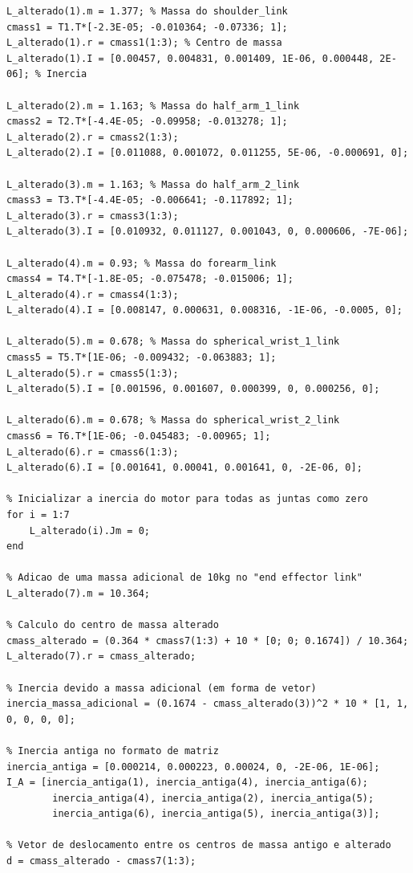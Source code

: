 \documentclass[10pt]{article}
\begin{document}
\begin{lstlisting}[caption={Código principal do trabalho}, label={code:codigo}]
% Massa, centro de massa e inercia para cada elo
L_alterado(1).m = 1.377; % Massa do shoulder_link
cmass1 = T1.T*[-2.3E-05; -0.010364; -0.07336; 1];
L_alterado(1).r = cmass1(1:3); % Centro de massa
L_alterado(1).I = [0.00457, 0.004831, 0.001409, 1E-06, 0.000448, 2E-06]; % Inercia

L_alterado(2).m = 1.163; % Massa do half_arm_1_link
cmass2 = T2.T*[-4.4E-05; -0.09958; -0.013278; 1];
L_alterado(2).r = cmass2(1:3);
L_alterado(2).I = [0.011088, 0.001072, 0.011255, 5E-06, -0.000691, 0];

L_alterado(3).m = 1.163; % Massa do half_arm_2_link
cmass3 = T3.T*[-4.4E-05; -0.006641; -0.117892; 1];
L_alterado(3).r = cmass3(1:3);
L_alterado(3).I = [0.010932, 0.011127, 0.001043, 0, 0.000606, -7E-06];

L_alterado(4).m = 0.93; % Massa do forearm_link
cmass4 = T4.T*[-1.8E-05; -0.075478; -0.015006; 1];
L_alterado(4).r = cmass4(1:3);
L_alterado(4).I = [0.008147, 0.000631, 0.008316, -1E-06, -0.0005, 0];

L_alterado(5).m = 0.678; % Massa do spherical_wrist_1_link
cmass5 = T5.T*[1E-06; -0.009432; -0.063883; 1];
L_alterado(5).r = cmass5(1:3);
L_alterado(5).I = [0.001596, 0.001607, 0.000399, 0, 0.000256, 0];

L_alterado(6).m = 0.678; % Massa do spherical_wrist_2_link
cmass6 = T6.T*[1E-06; -0.045483; -0.00965; 1];
L_alterado(6).r = cmass6(1:3);
L_alterado(6).I = [0.001641, 0.00041, 0.001641, 0, -2E-06, 0];

% Inicializar a inercia do motor para todas as juntas como zero
for i = 1:7
    L_alterado(i).Jm = 0;
end

% Adicao de uma massa adicional de 10kg no "end effector link"
L_alterado(7).m = 10.364;

% Calculo do centro de massa alterado
cmass_alterado = (0.364 * cmass7(1:3) + 10 * [0; 0; 0.1674]) / 10.364;
L_alterado(7).r = cmass_alterado;

% Inercia devido a massa adicional (em forma de vetor)
inercia_massa_adicional = (0.1674 - cmass_alterado(3))^2 * 10 * [1, 1, 0, 0, 0, 0];

% Inercia antiga no formato de matriz
inercia_antiga = [0.000214, 0.000223, 0.00024, 0, -2E-06, 1E-06];
I_A = [inercia_antiga(1), inercia_antiga(4), inercia_antiga(6); 
        inercia_antiga(4), inercia_antiga(2), inercia_antiga(5); 
        inercia_antiga(6), inercia_antiga(5), inercia_antiga(3)];

% Vetor de deslocamento entre os centros de massa antigo e alterado
d = cmass_alterado - cmass7(1:3);


\end{lstlisting}
\end{document}
